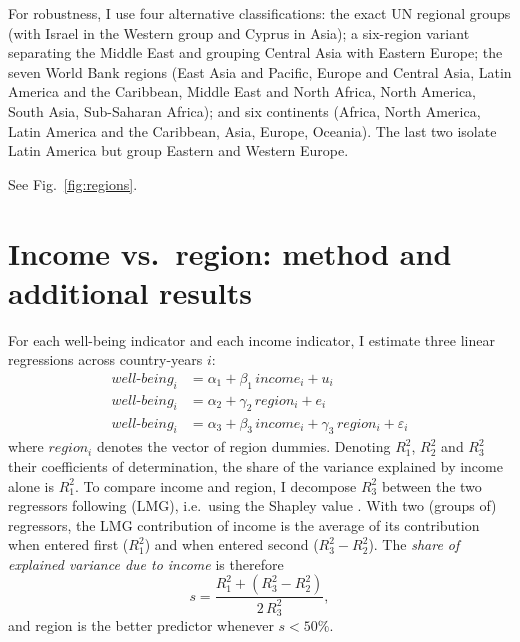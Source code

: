 \documentclass[11pt]{article}
\begin{document}
For robustness, I use four alternative classifications: the exact UN regional groups (with Israel in the Western group and Cyprus in Asia); a six-region variant separating the Middle East and grouping Central Asia with Eastern Europe; the seven World Bank regions (East Asia and Pacific, Europe and Central Asia, Latin America and the Caribbean, Middle East and North Africa, North America, South Asia, Sub-Saharan Africa); and six continents (Africa, North America, Latin America and the Caribbean, Asia, Europe, Oceania). The last two isolate Latin America but group Eastern and Western Europe.

See Fig.~\ref{fig:regions}.

\section{Income vs.\ region: method and additional results}\label{subsec:method_region}
For each well-being indicator and each income indicator, I estimate three linear regressions across country-years $i$:
\begin{align}
    well\text{-}being_i &= \alpha_1 + \beta_1\, income_i + u_i \label{eq:income}\\
    well\text{-}being_i &= \alpha_2 + \gamma_2\, region_i + e_i \label{eq:region}\\
    well\text{-}being_i &= \alpha_3 + \beta_3\, income_i + \gamma_3\, region_i + \varepsilon_i \label{eq:both}
\end{align}
where $region_i$ denotes the vector of region dummies. Denoting $R^2_1$, $R^2_2$ and $R^2_3$ their coefficients of determination, the share of the variance explained by income alone is $R^2_1$. To compare income and region, I decompose $R^2_3$ between the two regressors following \citet{lindeman_introduction_1980} (LMG), i.e.\ using the Shapley value \citep{gromping_estimators_2007}. With two (groups of) regressors, the LMG contribution of income is the average of its contribution when entered first ($R^2_1$) and when entered second ($R^2_3 - R^2_2$). The \textit{share of explained variance due to income} is therefore
\begin{equation}
    s = \frac{R^2_1 + (R^2_3 - R^2_2)}{2\, R^2_3}, \label{eq:share}
\end{equation}
and region is the better predictor whenever $s < 50\%$.
\end{document}
